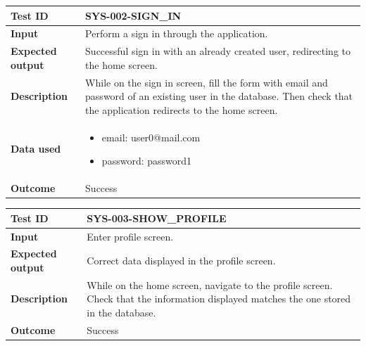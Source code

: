 \begin{table}[H]
    \centering
    \begin{tabular}{p{3cm}p{10cm}}
    \textbf{Test ID} & SYS-002-SIGN\_IN \\ \hline
    \textbf{Input} & Perform a sign in through the application. \\ \hline
    \textbf{Expected output} & Successful sign in with an already created user, redirecting to the home screen. \\ \hline
    \textbf{Description} & While on the sign in screen, fill the form with email and password of an existing user in the database. Then check that the application redirects to the home screen. \\ \hline
    \textbf{Data used} & 
        \begin{itemize}[label={}] \itemsep0em
            \item email: user0@mail.com
            \item password: password1
        \end{itemize} \\ \hline
    \textbf{Outcome} & Success \\ \hline
    \end{tabular}
\end{table}

\begin{table}[H]
    \centering
    \begin{tabular}{p{3cm}p{10cm}}
    \textbf{Test ID} & SYS-003-SHOW\_PROFILE \\ \hline
    \textbf{Input} & Enter profile screen. \\ \hline
    \textbf{Expected output} & Correct data displayed in the profile screen. \\ \hline
    \textbf{Description} & While on the home screen, navigate to the profile screen. Check that the information displayed matches the one stored in the database. \\ \hline
    \textbf{Outcome} & Success \\ \hline
    \end{tabular}
\end{table}


